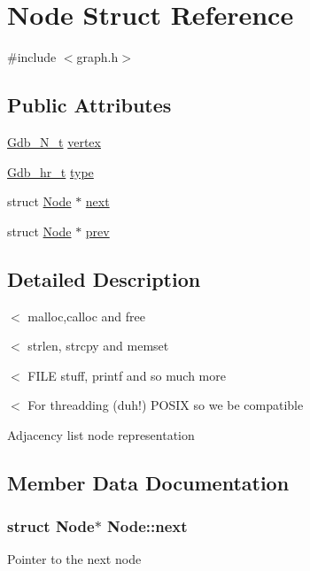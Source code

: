 \hypertarget{structNode}{}\section{Node Struct Reference}
\label{structNode}


{\ttfamily \#include $<$graph.\+h$>$}

\subsection*{Public Attributes}
\begin{DoxyCompactItemize}
\item 
\hyperlink{primitives_8h_a859f3e5b0c42fd108b94dfb804f70440}{Gdb\+\_\+\+N\+\_\+t} \hyperlink{structNode_a45403751d539252e099c10eed80f22b6}{vertex}
\item 
\hyperlink{primitives_8h_adc088f5af2bb04014551ec868bfe92cf}{Gdb\+\_\+hr\+\_\+t} \hyperlink{structNode_ac79e156afe348762ebdbf52da3cab08d}{type}
\item 
struct \hyperlink{structNode}{Node} $\ast$ \hyperlink{structNode_af67b110ca1a258b793bf69d306929b22}{next}
\item 
struct \hyperlink{structNode}{Node} $\ast$ \hyperlink{structNode_aea9fefc3628c3ce98b967e8addf06e88}{prev}
\end{DoxyCompactItemize}


\subsection{Detailed Description}
$<$ malloc,calloc and free

$<$ strlen, strcpy and memset

$<$ F\+I\+LE stuff, printf and so much more

$<$ For threadding (duh!) P\+O\+S\+IX so we be compatible

Adjacency list node representation 

\subsection{Member Data Documentation}
\subsubsection[{\texorpdfstring{next}{next}}]{\setlength{\rightskip}{0pt plus 5cm}struct {\bf Node}$\ast$ Node\+::next}\hypertarget{structNode_af67b110ca1a258b793bf69d306929b22}{}\label{structNode_af67b110ca1a258b793bf69d306929b22}
Pointer to the next node 
